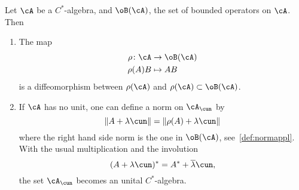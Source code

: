 \begin{lemma}
	Let $\cA$ be a $C^*$-algebra, and $\oB(\cA)$, the set of bounded operators on $\cA$. Then

	\begin{enumerate}
		\item The map
		      \begin{equation}
			      \begin{aligned}
				      \rho \colon \cA & \to \oB(\cA) \\
				      \rho(A)B        & \mapsto AB
			      \end{aligned}
		      \end{equation}
		      is a diffeomorphism between $\rho(\cA)$ and $\rho(\cA)\subset\oB(\cA)$.

		\item If $\cA$ has no unit, one can define a norm on $\cA_{\cun}$ by
		      \begin{equation} \label{eq:normCAu}
			      \|A+\lambda\cun\|=\|\rho(A)+\lambda\cun\|
		      \end{equation}
		      where the right hand side norm is the one in $\oB(\cA)$, see~\ref{def:normappl}. With the usual multiplication and the involution
		      \begin{equation}
			      (A+\lambda\cun)^*=A^*+ \overline{\lambda} \cun,
		      \end{equation}
		      the set $\cA_{\cun}$ becomes an unital $C^*$-algebra.

	\end{enumerate}
	\label{lem:unitariz_C}
\end{lemma}

